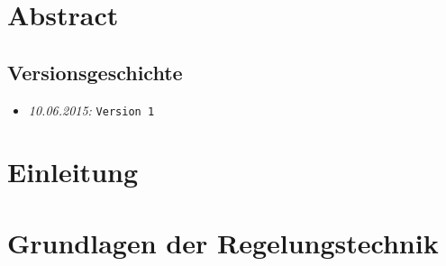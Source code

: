 \documentclass{fhnwreport/fhnwreport}
\begin{document}



\thispagestyle{empty}
\section*{Abstract}
\label{sec:abstract}



\clearpage
\thispagestyle{empty}




\pagestyle{empty}
{
    \renewcommand{\thispagestyle}[1]{}
    \tableofcontents
    \vspace{80mm}
    \subsection*{Versionsgeschichte}
    \begin{itemize}
        \item[]
            \emph{10.06.2015:} \texttt{Version 1}
    \end{itemize}
}

\clearpage
\setcounter{page}{1}
\pagestyle{headings}



\clearpage
\section{Einleitung}
\label{sec:einleitung}



\clearpage
\section{Grundlagen der Regelungstechnik}
\label{sec:grundlagenRegtech}

\end{document}
